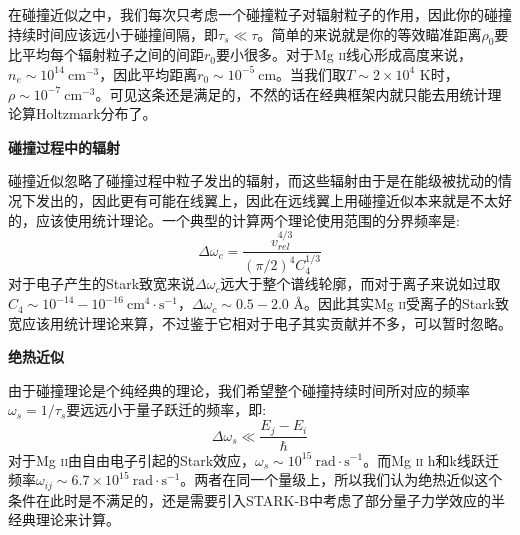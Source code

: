 在碰撞近似之中，我们每次只考虑一个碰撞粒子对辐射粒子的作用，因此你的碰撞持续时间应该远小于碰撞间隔，即$\tau_s \ll \tau $。简单的来说就是你的等效瞄准距离$\rho_0$要比平均每个辐射粒子之间的间距$r_0$要小很多。对于Mg \textsc{ii}线心形成高度来说，$n_e \sim 10^{14}\ \mathrm{cm^{-3}}$，因此平均距离$r_0 \sim 10^{-5}\ \mathrm{cm}$。当我们取$T\sim 2\times 10^4$ K时，$\rho\sim 10^{-7}\ \mathrm{cm^{-3}}$。可见这条还是满足的，不然的话在经典框架内就只能去用统计理论算Holtzmark分布了。

\textbf{碰撞过程中的辐射}

碰撞近似忽略了碰撞过程中粒子发出的辐射，而这些辐射由于是在能级被扰动的情况下发出的，因此更有可能在线翼上，因此在远线翼上用碰撞近似本来就是不太好的，应该使用统计理论。一个典型的计算两个理论使用范围的分界频率是\parencites{Mihalas2014}:
\begin{equation}
	\Delta \omega_{c}=\frac{v_{r e l}^{4 / 3}}{(\pi / 2)^{4} C_{4}^{1 / 3}}
\end{equation}
对于电子产生的Stark致宽来说$\Delta \omega_{c}$远大于整个谱线轮廓，而对于离子来说如过取$C_4 \sim 10^{-14}-10^{-16}\ \mathrm{cm^4\cdot s^{-1}}$，$\Delta \omega_{c}\sim 0.5 -2.0$ \mbox{\AA}。因此其实Mg \textsc{ii}受离子的Stark致宽应该用统计理论来算，不过鉴于它相对于电子其实贡献并不多，可以暂时忽略。

\textbf{绝热近似}

由于碰撞理论是个纯经典的理论，我们希望整个碰撞持续时间所对应的频率$\omega_s = 1/\tau_s$要远远小于量子跃迁的频率，即\parencites{Mihalas2014}:
\begin{equation}
	\Delta \omega_{s} \ll \frac{E_{j}-E_{i}}{\hbar}
\end{equation}
对于Mg \textsc{ii}由自由电子引起的Stark效应，$\omega_s\sim 10^{15}\ \mathrm{rad\cdot s^{-1}}$。而Mg \textsc{ii} h和k线跃迁频率$\omega_{ij}\sim 6.7\times 10^{15}\ \mathrm{rad\cdot s^{-1}}$。两者在同一个量级上，所以我们认为绝热近似这个条件在此时是不满足的，还是需要引入STARK-B中考虑了部分量子力学效应的半经典理论来计算。



